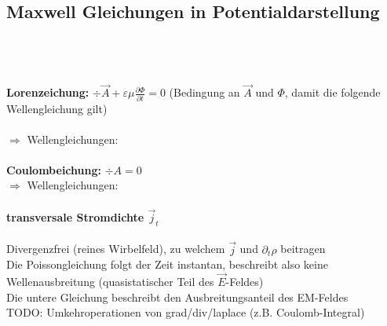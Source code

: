 \subsection{Maxwell Gleichungen in Potentialdarstellung}
\\
\\
\\
\textbf{Lorenzeichung:} $\div \vec A + \varepsilon \mu \frac{\partial \Phi}{\partial t} = 0$ (Bedingung an $\vec A$ und $\Phi$, damit die folgende Wellengleichung gilt)\\
\\
$\Rightarrow$ Wellengleichungen: \\
\\
\textbf{Coulombeichung:} $\div A = 0$\\
$\Rightarrow$ Wellengleichungen:
\paragraph{transversale Stromdichte $\vec j_t$} Divergenzfrei (reines Wirbelfeld), zu welchem $\vec j$ und $\partial_t \rho$ beitragen \\
Die Poissongleichung folgt der Zeit instantan, beschreibt also keine Wellenausbreitung (quasistatischer Teil des $\vec E$-Feldes) \\
Die untere Gleichung beschreibt den Ausbreitungsanteil des EM-Feldes \\

TODO: Umkehroperationen von grad/div/laplace (z.B. Coulomb-Integral)

